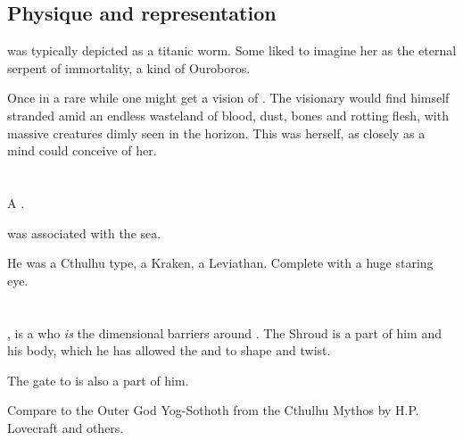 \subsection{Physique and representation}
\KhothSell was typically depicted as a titanic worm. 
Some \ophidians liked to imagine her as the eternal serpent of immortality, a kind of Ouroboros. 

Once in a rare while one might get a vision of \KhothSell.
The visionary would find himself stranded amid an endless wasteland of blood, dust, bones and rotting flesh, with massive creatures dimly seen in the horizon. 
This was \KhothSell herself, as closely as a \Miithian mind could conceive of her. 

















\section{\KyaethemChreiAz}
A \xzaishann.

\KyaethemChreiAz was associated with the sea. 

He was a Cthulhu type, a Kraken, a Leviathan. 
Complete with a huge staring eye. 


















\section{\NaathKurRamalech}
\index{\NaathKurRamalech}
\NaathKurRamalech{}, is a  who \emph{is} the dimensional barriers around \Miith{}. The Shroud is a part of him and his body, which he has allowed the \dragons{} and \banes{} to shape and twist. 

The gate to \Erebos{} is also a part of him.

Compare to the Outer God Yog-Sothoth from the Cthulhu Mythos by H.P. Lovecraft and others. 

